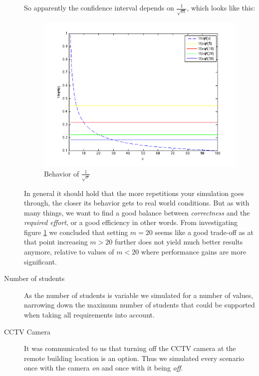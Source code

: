 \documentclass[a4paper]{scrreprt}
\begin{document}
\begin{description}
			So apparently the confidence interval depends on $\frac{1}{\sqrt{m}}$, which looks like this:
			
			\begin{figure}[H]
				\center\includegraphics[width=\textwidth]{../Get_Simulation_Parameters/Number_Of_Runs.png}
				\caption{Behavior of $\frac{1}{\sqrt{x}}$}
				\label{fig:numberofruns}
			\end{figure}	
			
			In general it should hold that the more repetitions your simulation goes through, the closer its behavior gets to real world conditions. But as with many things, we want to find a good balance between \emph{correctness} and the \emph{required effort}, or a good efficiency in other words. From investigating figure \ref{fig:numberofruns} we concluded that setting $m=20$ seems like a good trade-off as at that point increasing $m>20$ further does not yield much better results anymore, relative to values of $m<20$ where performance gains are more significant.
			
			
			\item[Number of students] As the number of students is variable we simulated for a number of values, narrowing down the maximum number of students that could be supported when taking all requirements into account.
			
			
			\item[CCTV Camera] It was communicated to us that turning off the CCTV camera at the remote building location is an option. Thus we simulated every scenario once with the camera \emph{on} and once with it being \emph{off}.
		\end{description}	
		
\end{document}
